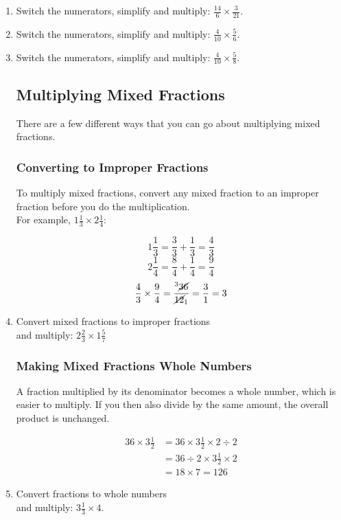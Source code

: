 \documentclass[14pt]{article}
\begin{document}
\begin{enumerate}
\item Switch the numerators, simplify and multiply: $\frac{14}{6} \times \frac{3}{21}$.
\item Switch the numerators, simplify and multiply: $\frac{4}{10} \times \frac{5}{6}$.
\item Switch the numerators, simplify and multiply: $\frac{4}{10} \times \frac{5}{8}$.

\subsection*{Multiplying Mixed Fractions}
There are a few different ways that you can go about multiplying mixed fractions.

\subsubsection*{Converting to Improper Fractions}
To multiply mixed fractions, convert any mixed fraction to an improper fraction before you do the multiplication.\\

For example, $1 \frac{1}{3} \times 2 \frac{1}{4}:$

$$1 \frac{1}{3} = \frac{3}{3} + \frac{1}{3} = \frac{4}{3}$$
$$2 \frac{1}{4} = \frac{8}{4} + \frac{1}{4} = \frac{9}{4}$$
$$\frac{4}{3} \times \frac{9}{4} = \frac{^3 \cancel{36}}{\cancel{12}_1} = \frac{3}{1} = 3$$

\item Convert mixed fractions to improper fractions\\ and multiply: $2 \frac{2}{3} \times1 \frac{5}{7}$

\subsubsection*{Making Mixed Fractions Whole Numbers}
A fraction multiplied by its denominator becomes a whole number, which is easier to multiply. If you then also divide by the same amount, the overall product is unchanged.

\begin{align*}
36 \times 3 \frac{1}{2} &= 36 \times 3 \frac{1}{2} \times 2 \div 2\\
&= 36 \div 2 \times 3 \frac{1}{2} \times 2\\
&= 18 \times 7 = 126
\end{align*}

\item Convert fractions to whole numbers\\ and multiply: $3\frac{1}{3}\times4$.


\end{enumerate}
\end{document}
